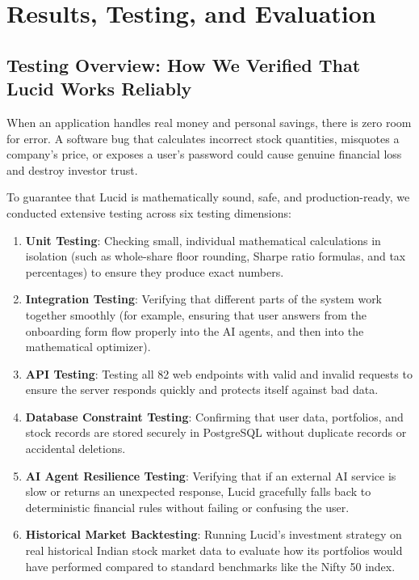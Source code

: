 \chapter{Results, Testing, and Evaluation}

\section{Testing Overview: How We Verified That Lucid Works Reliably}
When an application handles real money and personal savings, there is zero room for error. A software bug that calculates incorrect stock quantities, misquotes a company's price, or exposes a user's password could cause genuine financial loss and destroy investor trust.

To guarantee that Lucid is mathematically sound, safe, and production-ready, we conducted extensive testing across six testing dimensions:
\begin{enumerate}
    \item \textbf{Unit Testing}: Checking small, individual mathematical calculations in isolation (such as whole-share floor rounding, Sharpe ratio formulas, and tax percentages) to ensure they produce exact numbers.
    \item \textbf{Integration Testing}: Verifying that different parts of the system work together smoothly (for example, ensuring that user answers from the onboarding form flow properly into the AI agents, and then into the mathematical optimizer).
    \item \textbf{API Testing}: Testing all 82 web endpoints with valid and invalid requests to ensure the server responds quickly and protects itself against bad data.
    \item \textbf{Database Constraint Testing}: Confirming that user data, portfolios, and stock records are stored securely in PostgreSQL without duplicate records or accidental deletions.
    \item \textbf{AI Agent Resilience Testing}: Verifying that if an external AI service is slow or returns an unexpected response, Lucid gracefully falls back to deterministic financial rules without failing or confusing the user.
    \item \textbf{Historical Market Backtesting}: Running Lucid's investment strategy on real historical Indian stock market data to evaluate how its portfolios would have performed compared to standard benchmarks like the Nifty 50 index.
\end{enumerate}


